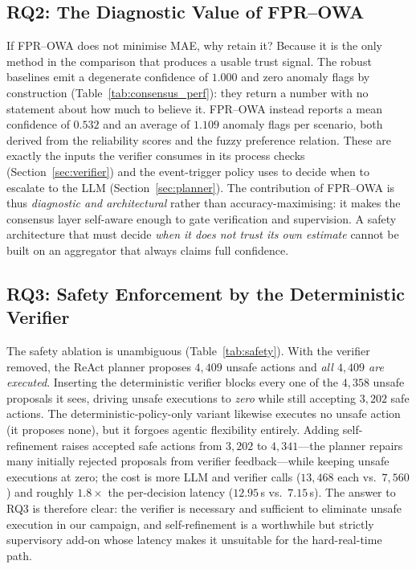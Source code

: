 \documentclass[preprint,11pt]{elsarticle}
\begin{document}



\subsection{RQ2: The Diagnostic Value of FPR--OWA}
\label{sec:results_rq2}

If FPR--OWA does not minimise MAE, why retain it? Because it is the only
method in the comparison that produces a usable trust signal. The robust
baselines emit a degenerate confidence of $1.000$ and zero anomaly flags
by construction (Table~\ref{tab:consensus_perf}): they return a number
with no statement about how much to believe it. FPR--OWA instead reports
a mean confidence of $0.532$ and an average of $1.109$ anomaly flags per
scenario, both derived from the reliability scores and the fuzzy
preference relation. These are exactly the inputs the verifier consumes
in its process checks (Section~\ref{sec:verifier}) and the event-trigger
policy uses to decide when to escalate to the LLM
(Section~\ref{sec:planner}). The contribution of FPR--OWA is thus
\emph{diagnostic and architectural} rather than accuracy-maximising: it
makes the consensus layer self-aware enough to gate verification and
supervision. A safety architecture that must decide \emph{when it does
not trust its own estimate} cannot be built on an aggregator that always
claims full confidence.

\subsection{RQ3: Safety Enforcement by the Deterministic Verifier}
\label{sec:results_rq3}

The safety ablation is unambiguous (Table~\ref{tab:safety}). With the
verifier removed, the ReAct planner
proposes $4{,}409$ unsafe actions and \emph{all $4{,}409$ are executed}.
Inserting the deterministic verifier blocks every one of the $4{,}358$
unsafe proposals it sees, driving unsafe executions to \emph{zero} while
still accepting $3{,}202$ safe actions. The deterministic-policy-only
variant likewise executes no unsafe action (it proposes none), but it
forgoes agentic flexibility entirely. Adding self-refinement raises
accepted safe actions from $3{,}202$ to $4{,}341$---the planner repairs
many initially rejected proposals from verifier feedback---while keeping
unsafe executions at zero; the cost is more LLM and verifier calls
($13{,}468$ each vs.\ $7{,}560$) and roughly $1.8\times$ the per-decision
latency ($12.95$\,s vs.\ $7.15$\,s). The answer to RQ3 is therefore
clear: the verifier is necessary and sufficient to eliminate unsafe
execution in our campaign, and self-refinement is a worthwhile but
strictly supervisory add-on whose latency makes it unsuitable for the
hard-real-time path.
\end{document}
